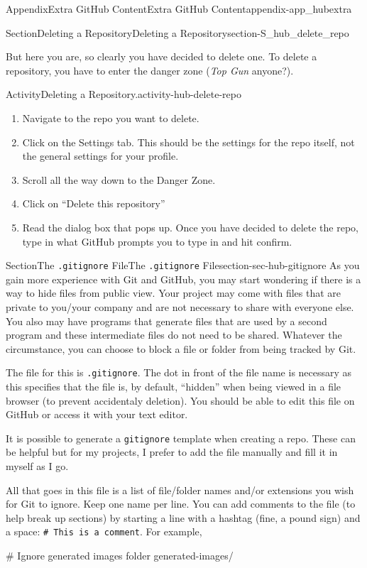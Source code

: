 \documentclass[oneside,10pt,]{book}
\newcommand{\mono}[1]{\texttt{#1}}
\newcommand{\pubtitle}[1]{\textsl{#1}}
\begin{document}
\begin{appendixptx}{Appendix}{Extra GitHub Content}{}{Extra GitHub Content}{}{}{appendix-app_hubextra}
\begin{sectionptx}{Section}{Deleting a Repository}{}{Deleting a Repository}{}{}{section-S_hub_delete_repo}
\par
But here you are, so clearly you have decided to delete one. To delete a repository, you have to enter the danger zone (\pubtitle{Top Gun} anyone?).%
\begin{activity}{Activity}{Deleting a Repository.}{activity-hub-delete-repo}%
\begin{enumerate}[font=\bfseries,label=(\alph*),ref=\alph*]%
\item{}Navigate to the repo you want to delete.%
\item{}Click on the Settings tab. This should be the settings for the repo itself, not the general settings for your profile.%
\item{}Scroll all the way down to the Danger Zone.%
\item{}Click on ``Delete this repository''%
\item{}Read the dialog box that pops up. Once you have decided to delete the repo, type in what GitHub prompts you to type in and hit confirm.%
\end{enumerate}%
\end{activity}%
\end{sectionptx}
%
%
\typeout{************************************************}
\typeout{Section B.7 The \mono{.gitignore} File}
\typeout{************************************************}
%
\begin{sectionptx}{Section}{The \mono{.gitignore} File}{}{The \mono{.gitignore} File}{}{}{section-sec-hub-gitignore}
As you gain more experience with Git and GitHub, you may start wondering if there is a way to hide files from public view. Your project may come with files that are private to you\slash{}your company and are not necessary to share with everyone else. You also may have programs that generate files that are used by a second program and these intermediate files do not need to be shared. Whatever the circumstance, you can choose to block a file or folder from being tracked by Git.%
\par
The file for this is \mono{.gitignore}. The dot in front of the file name is necessary as this specifies that the file is, by default, ``hidden'' when being viewed in a file browser (to prevent accidentaly deletion). You should be able to edit this file on GitHub or access it with your text editor.%
\par
It is possible to generate a \mono{gitignore} template when creating a repo. These can be helpful but for my projects, I prefer to add the file manually and fill it in myself as I go.%
\par
All that goes in this file is a list of file\slash{}folder names and\slash{}or extensions you wish for Git to ignore. Keep one name per line. You can add comments to the file (to help break up sections) by starting a line with a hashtag (fine, a pound sign) and a space: \mono{\# This is a comment}. For example,%
\begin{codedisplay}
# Ignore generated images folder
generated-images/


\end{codedisplay}
\end{sectionptx}
\end{appendixptx}
\end{document}

